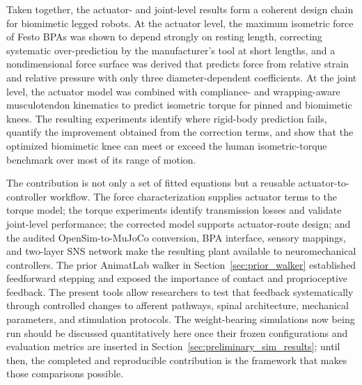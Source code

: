 \begin{reviewchange}
Taken together, the actuator- and joint-level results form a coherent design chain for biomimetic legged robots. At the actuator level, the maximum isometric force of Festo BPAs was shown to depend strongly on resting length, correcting systematic over-prediction by the manufacturer's tool at short lengths, and a nondimensional force surface was derived that predicts force from relative strain and relative pressure with only three diameter-dependent coefficients. At the joint level, the actuator model was combined with compliance- and wrapping-aware musculotendon kinematics to predict isometric torque for pinned and biomimetic knees. The resulting experiments identify where rigid-body prediction fails, quantify the improvement obtained from the correction terms, and show that the optimized biomimetic knee can meet or exceed the human isometric-torque benchmark over most of its range of motion.

The contribution is not only a set of fitted equations but a reusable actuator-to-controller workflow. The force characterization supplies actuator terms to the torque model; the torque experiments identify transmission losses and validate joint-level performance; the corrected model supports actuator-route design; and the audited OpenSim-to-MuJoCo conversion, BPA interface, sensory mappings, and two-layer SNS network make the resulting plant available to neuromechanical controllers. The prior AnimatLab walker in Section~\ref{sec:prior_walker} established feedforward stepping and exposed the importance of contact and proprioceptive feedback. The present tools allow researchers to test that feedback systematically through controlled changes to afferent pathways, spinal architecture, mechanical parameters, and stimulation protocols. The weight-bearing simulations now being run should be discussed quantitatively here once their frozen configurations and evaluation metrics are inserted in Section~\ref{sec:preliminary_sim_results}; until then, the completed and reproducible contribution is the framework that makes those comparisons possible.
\end{reviewchange}
